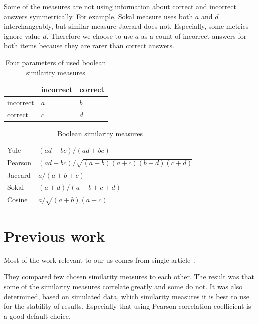\documentclass[
  printed, %
  table,   %
  nolof,     %
  nolot,     %
  color,
  final,
  nocover
]{fithesis3}
\begin{document}
Some of the measures are not using information about correct and incorrect answers symmetrically. For example, Sokal measure uses both $a$ and $d$ interchangeably, but similar measure Jaccard does not. Especially, some metrics ignore value $d$. Therefore we choose to use $a$ as a count of incorrect answers for both items because they are rarer than correct answers.


\begin{table}
  \begin{tabular}{ | l | l l | }
      \hline
      \cellcolor[gray]{1.0} & incorrect & correct \\ \hline
      incorrect & $a$ & $b$ \\
      correct & $c$ & $d$ \\ \hline
  \end{tabular}

  \caption{Four parameters of used boolean similarity measures}
  \label{tab:boolean-attributes}
\end{table}

\begin{table}
  \begin{tabular}{ | l | l | }
        \hline
      Yule    & $(ad-bc)/(ad+bc)$                         \\
      Pearson & $(ad - bc) / \sqrt{(a+b)(a+c)(b+d)(c+d)}$ \\
      Jaccard & $a / (a+b+c)$                             \\
      Sokal   & $(a+d)/(a+b+c+d)$                         \\
      Cosine  & $a / \sqrt{ (a+b)(a+c) }$                 \\
      \hline
  \end{tabular}
  \caption{Boolean similarity measures}
  \label{tab:boolean-similarity-measures}
\end{table}


\section{Previous work}\label{previous-work}

Most of the work relevant to our us comes from single article~\cite{pelanek2017measuring}.

They compared few chosen similarity measures to each other. The result was that some of the similarity measures correlate greatly and some do not. It was also determined, based on simulated data, which similarity measures it is best to use for the stability of results. Especially that using Pearson correlation coefficient is a good default choice.
\end{document}
